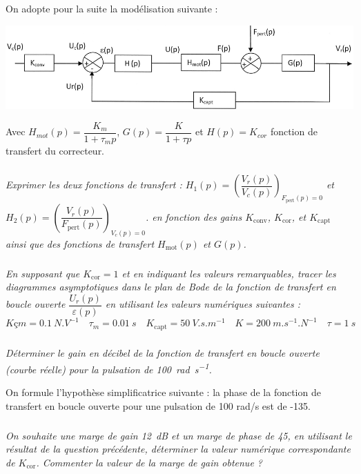 \documentclass[10pt,fleqn]{article} %
\begin{document}
\vspace{.25cm}
On adopte pour la suite la modélisation suivante :

\begin{center}
	\includegraphics[width=\linewidth]{images/fig_14}
\end{center}

Avec $H_{mot}(p)=\dfrac{K_m}{1+\tau_m p}$, $G(p)=\dfrac{K}{1+\tau p}$ et $H(p)=K_{cor}$ fonction de transfert du correcteur.


\subparagraph{}
\textit{Exprimer les deux fonctions de transfert : $H_1(p)=\left(\dfrac{V_r(p)}{V_c(p)} \right)_{F_{\text{pert}}(p)=0}$ et $H_2(p)=\left(\dfrac{V_r(p)}{F_{\text{pert}}(p)} \right)_{V_c(p)=0}$. en fonction des gains $K_\text{conv}$, $K_{\text{cor}}$, et $K_{\text{capt}}$ ainsi que des fonctions de transfert $H_{\text{mot}}(p)$ et $G(p)$.}
\ifprof
\begin{corrige}
\end{corrige}
\else
\fi


\subparagraph{}
\textit{En supposant que $K_{\text{cor}}= 1$ et en indiquant les valeurs remarquables, tracer les diagrammes asymptotiques dans le plan de Bode de la fonction de transfert en boucle ouverte $\dfrac{U_r (p)}{\varepsilon(p)}$ en utilisant les valeurs numériques suivantes :}
$$
Kçm = \SI{0.1}{N.V^{-1}} 
\quad \tau_m= \SI{0,01}{s} 
\quad K_{\text{capt}} = \SI{50}{V.s.m^{-1}}
\quad K = \SI{200}{m.s^{-1}.N^{-1}}
\quad \tau = \SI{1}{s}
$$

\ifprof
\begin{corrige}
\end{corrige}
\else
\fi


\subparagraph{}
\textit{Déterminer le gain en décibel de la fonction de transfert en boucle ouverte (courbe réelle) pour la pulsation de \SI{100}{rad.s^{-1}}.}
\ifprof
\begin{corrige}
\end{corrige}
\else
\fi


On formule l’hypothèse simplificatrice suivante : la phase de la fonction de transfert en boucle ouverte pour une pulsation de 100 rad/s est de -135\degres.


\subparagraph{}
\textit{On souhaite une marge de gain \SI{12}{dB} et un marge de phase de 45\degres, en utilisant le résultat de la question précédente, déterminer la valeur numérique correspondante de $K_{\text{cor}}$.
Commenter la valeur de la marge de gain obtenue ?}
\ifprof
\begin{corrige}
\end{corrige}
\else
\fi
\end{document}
